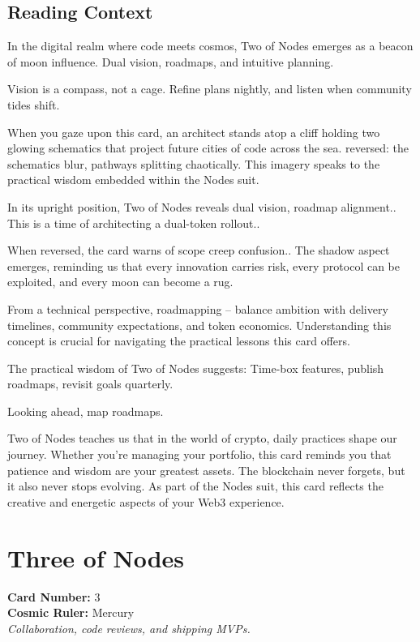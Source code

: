 \documentclass[11pt,oneside]{book}
\begin{document}
\begin{minipage}[t]{0.55\textwidth}
  \subsection*{Reading Context}
  In the digital realm where code meets cosmos, Two of Nodes emerges as a beacon of moon influence. Dual vision, roadmaps, and intuitive planning.

  Vision is a compass, not a cage. Refine plans nightly, and listen when community tides shift.

  When you gaze upon this card, an architect stands atop a cliff holding two glowing schematics that project future cities of code across the sea. reversed: the schematics blur, pathways splitting chaotically. This imagery speaks to the practical wisdom embedded within the Nodes suit.

  In its upright position, Two of Nodes reveals dual vision, roadmap alignment.. This is a time of architecting a dual-token rollout..

  When reversed, the card warns of scope creep confusion.. The shadow aspect emerges, reminding us that every innovation carries risk, every protocol can be exploited, and every moon can become a rug.

  From a technical perspective, roadmapping – balance ambition with delivery timelines, community expectations, and token economics. Understanding this concept is crucial for navigating the practical lessons this card offers.

  The practical wisdom of Two of Nodes suggests: Time-box features, publish roadmaps, revisit goals quarterly.

  Looking ahead, map roadmaps.

  Two of Nodes teaches us that in the world of crypto, daily practices shape our journey. Whether you're managing your portfolio, this card reminds you that patience and wisdom are your greatest assets. The blockchain never forgets, but it also never stops evolving. As part of the Nodes suit, this card reflects the creative and energetic aspects of your Web3 experience.

\end{minipage}

\newpage
\section*{Three of Nodes}

\begin{minipage}[t]{0.55\textwidth}
  \vspace{0pt}
  \textbf{Card Number:} 3\\  \textbf{Cosmic Ruler:} Mercury\\  \textit{Collaboration, code reviews, and shipping MVPs.}
\end{minipage}
\end{document}
